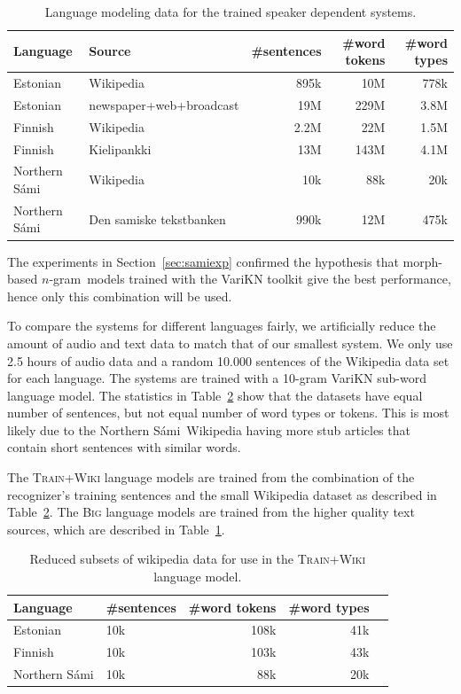 \documentclass[b5paper]{article}
\newcommand{\ns}{Northern Sámi}
\newcommand{\ngram}{$n$-gram}
\newcommand{\ds}[1]{\textsc{#1}}
\begin{document}
\begin{table}
\centering
\begin{tabular}{llrrr}
\textbf{Language} & \textbf{Source} & \textbf{\#sentences} & \textbf{ \#word tokens} & \textbf{\#word types}\\\hline
Estonian & Wikipedia &  895k & 10M & 778k \\
 Estonian & newspaper+web+broadcast \cite{kurimo2015modeling} & 19M  & 229M  & 3.8M \\
 Finnish & Wikipedia &  2.2M  & 22M & 1.5M \\
 Finnish & Kielipankki & 13M &  143M & 4.1M \\
 \ns & Wikipedia & 10k & 88k & 20k\\
 \ns & Den samiske tekstbanken & 990k & 12M & 475k\\
\end{tabular}
\caption{Language modeling data for the trained speaker dependent systems.\label{tbl:lmdatacomp}}
\end{table}

The experiments in Section~\ref{sec:samiexp} confirmed the hypothesis that morph-based \ngram\ models trained with the VariKN toolkit give the best performance, hence only this combination will be used.

To compare the systems for different languages fairly, we artificially reduce the amount of audio and text data to match that of our smallest system. We only use 2.5 hours of audio data and a random 10.000 sentences of the Wikipedia data set for each language. The systems are trained with a 10-gram VariKN sub-word language model. The statistics in Table~\ref{tbl:lmdatacomp_small} show that the datasets have equal number of sentences, but not equal number of word types or tokens. This is most likely due to the \ns\ Wikipedia having more stub articles that contain short sentences with similar words.

The \ds{Train+Wiki} language models are trained from the combination of the recognizer's training sentences and the small Wikipedia dataset as described in Table~\ref{tbl:lmdatacomp_small}. The \ds{Big} language models are trained from the higher quality text sources, which are described in Table~\ref{tbl:lmdatacomp}.

\begin{table}
\centering
\begin{tabular}{llrrr}
\textbf{Language} & \textbf{\#sentences} & \textbf{\#word tokens} & \textbf{\#word types}\\\hline
Estonian &   10k & 108k & 41k \\
 Finnish &   10k  & 103k & 43k \\
 \ns &  10k & 88k & 20k\\
\end{tabular}
\caption{Reduced subsets of wikipedia data for use in the \ds{Train+Wiki} language model.\label{tbl:lmdatacomp_small}}
\end{table}
\end{document}
